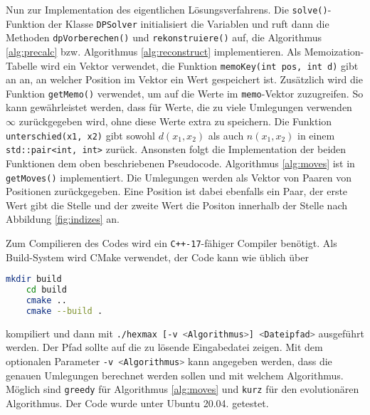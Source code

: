 \documentclass[a4paper,10pt,ngerman]{scrartcl}
\begin{document}
Nun zur Implementation des eigentlichen Lösungsverfahrens. 
Die \lstinline{solve()}-Funktion  der Klasse \lstinline{DPSolver} initialisiert die Variablen und ruft dann die Methoden \lstinline{dpVorberechen()} und \lstinline{rekonstruiere()}  auf, die Algorithmus \ref{alg:precalc} bzw. Algorithmus \ref{alg:reconstruct} implementieren.
Als Memoization-Tabelle wird ein Vektor verwendet, die Funktion \lstinline{memoKey(int pos, int d)} gibt an an, an welcher Position im Vektor ein Wert gespeichert ist. 
Zusätzlich wird die Funktion \lstinline{getMemo()} verwendet, um auf die Werte im \lstinline{memo}-Vektor zuzugreifen. 
So kann gewährleistet werden, dass für Werte, die zu viele Umlegungen verwenden $\infty$ zurückgegeben wird, ohne diese Werte extra zu speichern. 
Die Funktion \lstinline{unterschied(x1, x2)} gibt sowohl $d(x_1, x_2)$ als auch $n(x_1, x_2)$ in einem \lstinline{std::pair<int, int>} zurück. 
Ansonsten folgt die Implementation der beiden Funktionen dem oben beschriebenen Pseudocode. 
Algorithmus \ref{alg:moves} ist in \lstinline{getMoves()} implementiert. 
Die Umlegungen werden als Vektor von Paaren von Positionen zurückgegeben.
Eine Position ist dabei ebenfalls ein Paar, der erste Wert gibt die Stelle und der zweite Wert die Positon innerhalb der Stelle nach Abbildung \ref{fig:indizes} an.

Zum Compilieren des Codes wird ein \texttt{C++-17}-fähiger Compiler benötigt.
Als Build-System wird CMake verwendet, der Code kann wie üblich über 
\begin{lstlisting}[language=bash]
    mkdir build
    cd build
    cmake ..
    cmake --build . 
\end{lstlisting}    
kompiliert und dann mit \lstinline[language=bash]{./hexmax [-v <Algorithmus>] <Dateipfad>} ausgeführt werden. Der Pfad sollte auf die zu lösende Eingabedatei zeigen. Mit dem optionalen Parameter \lstinline[language=bash]{-v <Algorithmus>} kann angegeben werden, dass die genauen Umlegungen berechnet werden sollen und mit welchem Algorithmus. Möglich sind \lstinline[language=bash]{greedy} für Algorithmus \ref{alg:moves} und \lstinline[language=bash]{kurz} für den evolutionären Algorithmus. Der Code wurde unter Ubuntu 20.04. getestet. 
\end{document}
